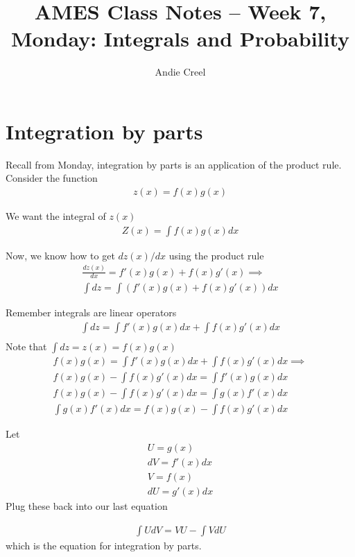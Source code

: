 \documentclass{article}
\title{AMES Class Notes -- Week 7, Monday: Integrals and Probability}
\author{Andie Creel}
\begin{document}
\maketitle

\section{Integration by parts}
Recall from Monday, integration by parts is an application of the product rule.  \\

Consider the function 
\begin{align}
    z(x) = f(x) g(x)
\end{align}

We want the integral of $z(x)$ 
\begin{align}
    Z(x) = \int f(x)g(x) dx 
\end{align}

Now, we know how to get $dz(x) /dx$ using the product rule
\begin{align}
    \frac{dz(x)}{dx} = f'(x) g(x) + f(x) g'(x) \implies\\
    \int dz = \int (f'(x) g(x) + f(x) g'(x)) dx 
\end{align}

Remember integrals are linear operators
\begin{align}
    \int dz = \int f'(x) g(x) dx + \int f(x) g'(x) dx\\
\end{align}
Note that $\int dz = z(x) = f(x) g(x)$
\begin{align}
    f(x) g(x) = \int f'(x) g(x) dx + \int f(x) g'(x) dx \implies \\
    f(x) g(x) - \int f(x) g'(x) dx = \int f'(x) g(x) dx \\
    f(x) g(x) - \int f(x) g'(x) dx = \int g(x) f'(x) dx  \\
    \int g(x) f'(x) dx = f(x) g(x) - \int f(x) g'(x) dx
\end{align}

Let 
\begin{align}
    U = g(x) \\
    dV = f'(x)dx \\
    V = f(x) \\
    dU = g'(x)dx
\end{align}
Plug these back into our last equation 

\begin{align}
    \int U dV = V U - \int V dU
\end{align}
which is the equation for integration by parts. \\
\end{document}
